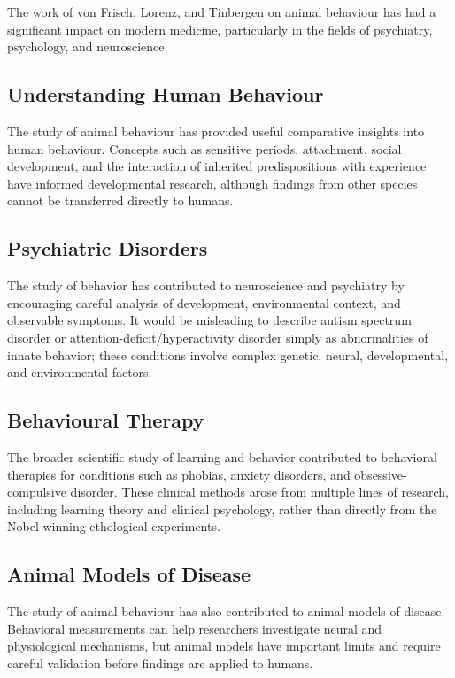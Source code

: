 The work of von Frisch, Lorenz, and Tinbergen on animal behaviour has had a significant impact on modern medicine, particularly in the fields of psychiatry, psychology, and neuroscience.

\subsection{Understanding Human Behaviour}

The study of animal behaviour has provided useful comparative insights into human behaviour. Concepts such as sensitive periods, attachment, social development, and the interaction of inherited predispositions with experience have informed developmental research, although findings from other species cannot be transferred directly to humans.

\subsection{Psychiatric Disorders}

The study of behavior has contributed to neuroscience and psychiatry by encouraging careful analysis of development, environmental context, and observable symptoms. It would be misleading to describe autism spectrum disorder or attention-deficit/hyperactivity disorder simply as abnormalities of innate behavior; these conditions involve complex genetic, neural, developmental, and environmental factors.

\subsection{Behavioural Therapy}

The broader scientific study of learning and behavior contributed to behavioral therapies for conditions such as phobias, anxiety disorders, and obsessive-compulsive disorder. These clinical methods arose from multiple lines of research, including learning theory and clinical psychology, rather than directly from the Nobel-winning ethological experiments.

\subsection{Animal Models of Disease}

The study of animal behaviour has also contributed to animal models of disease. Behavioral measurements can help researchers investigate neural and physiological mechanisms, but animal models have important limits and require careful validation before findings are applied to humans.

